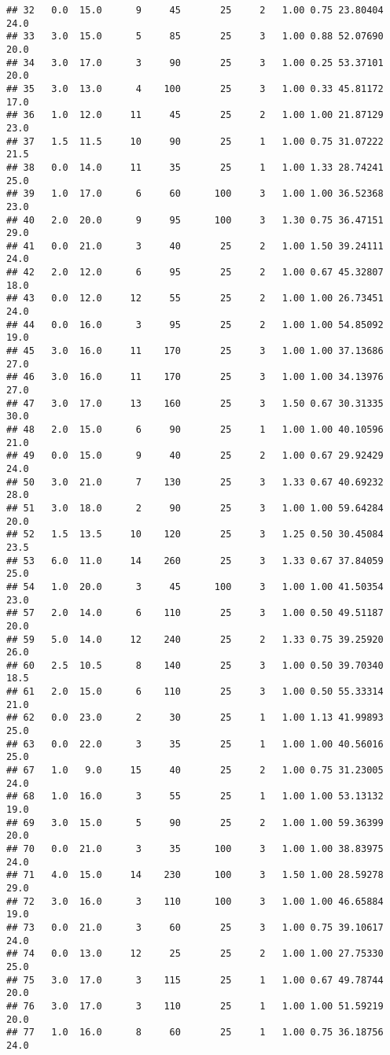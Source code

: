 \documentclass[
]{article}
\begin{document}
\begin{verbatim}
## 32   0.0  15.0      9     45       25     2   1.00 0.75 23.80404      24.0
## 33   3.0  15.0      5     85       25     3   1.00 0.88 52.07690      20.0
## 34   3.0  17.0      3     90       25     3   1.00 0.25 53.37101      20.0
## 35   3.0  13.0      4    100       25     3   1.00 0.33 45.81172      17.0
## 36   1.0  12.0     11     45       25     2   1.00 1.00 21.87129      23.0
## 37   1.5  11.5     10     90       25     1   1.00 0.75 31.07222      21.5
## 38   0.0  14.0     11     35       25     1   1.00 1.33 28.74241      25.0
## 39   1.0  17.0      6     60      100     3   1.00 1.00 36.52368      23.0
## 40   2.0  20.0      9     95      100     3   1.30 0.75 36.47151      29.0
## 41   0.0  21.0      3     40       25     2   1.00 1.50 39.24111      24.0
## 42   2.0  12.0      6     95       25     2   1.00 0.67 45.32807      18.0
## 43   0.0  12.0     12     55       25     2   1.00 1.00 26.73451      24.0
## 44   0.0  16.0      3     95       25     2   1.00 1.00 54.85092      19.0
## 45   3.0  16.0     11    170       25     3   1.00 1.00 37.13686      27.0
## 46   3.0  16.0     11    170       25     3   1.00 1.00 34.13976      27.0
## 47   3.0  17.0     13    160       25     3   1.50 0.67 30.31335      30.0
## 48   2.0  15.0      6     90       25     1   1.00 1.00 40.10596      21.0
## 49   0.0  15.0      9     40       25     2   1.00 0.67 29.92429      24.0
## 50   3.0  21.0      7    130       25     3   1.33 0.67 40.69232      28.0
## 51   3.0  18.0      2     90       25     3   1.00 1.00 59.64284      20.0
## 52   1.5  13.5     10    120       25     3   1.25 0.50 30.45084      23.5
## 53   6.0  11.0     14    260       25     3   1.33 0.67 37.84059      25.0
## 54   1.0  20.0      3     45      100     3   1.00 1.00 41.50354      23.0
## 57   2.0  14.0      6    110       25     3   1.00 0.50 49.51187      20.0
## 59   5.0  14.0     12    240       25     2   1.33 0.75 39.25920      26.0
## 60   2.5  10.5      8    140       25     3   1.00 0.50 39.70340      18.5
## 61   2.0  15.0      6    110       25     3   1.00 0.50 55.33314      21.0
## 62   0.0  23.0      2     30       25     1   1.00 1.13 41.99893      25.0
## 63   0.0  22.0      3     35       25     1   1.00 1.00 40.56016      25.0
## 67   1.0   9.0     15     40       25     2   1.00 0.75 31.23005      24.0
## 68   1.0  16.0      3     55       25     1   1.00 1.00 53.13132      19.0
## 69   3.0  15.0      5     90       25     2   1.00 1.00 59.36399      20.0
## 70   0.0  21.0      3     35      100     3   1.00 1.00 38.83975      24.0
## 71   4.0  15.0     14    230      100     3   1.50 1.00 28.59278      29.0
## 72   3.0  16.0      3    110      100     3   1.00 1.00 46.65884      19.0
## 73   0.0  21.0      3     60       25     3   1.00 0.75 39.10617      24.0
## 74   0.0  13.0     12     25       25     2   1.00 1.00 27.75330      25.0
## 75   3.0  17.0      3    115       25     1   1.00 0.67 49.78744      20.0
## 76   3.0  17.0      3    110       25     1   1.00 1.00 51.59219      20.0
## 77   1.0  16.0      8     60       25     1   1.00 0.75 36.18756      24.0
\end{verbatim}
\end{document}
